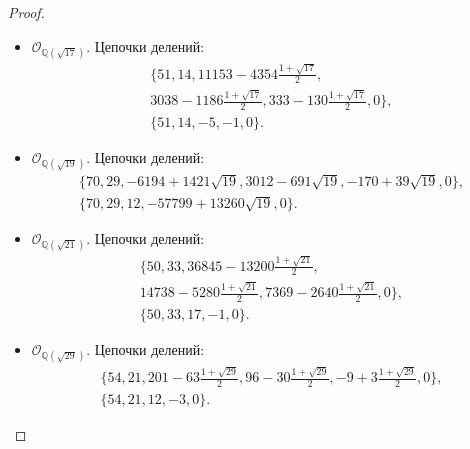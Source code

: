 \documentclass[_00_dissertation.tex]{subfiles}
\begin{document}
\begin{proof}
\begin{itemize}
        \item $\mathcal{O}_{\mathbb{Q}(\sqrt{17})}$.
        Цепочки делений:
        \begin{equation*}
            \begin{split}
                \{51, 14, 11153-4354\frac{1+\sqrt{17}}{2},\\
                    3038-1186\frac{1+\sqrt{17}}{2}, 333-130\frac{1+\sqrt{17}}{2}, 0\},\\
                \{51, 14, -5, -1, 0\}.
            \end{split}
        \end{equation*}
    
        \item $\mathcal{O}_{\mathbb{Q}(\sqrt{19})}$.
        Цепочки делений:
        \begin{equation*}
            \begin{split}
                \{70, 29, -6194+1421\sqrt{19}, 3012-691\sqrt{19}, -170+39\sqrt{19}, 0\},\\
                \{70, 29, 12, -57799+13260\sqrt{19}, 0\}.
            \end{split}
        \end{equation*}
    
        \item $\mathcal{O}_{\mathbb{Q}(\sqrt{21})}$.
        Цепочки делений:
        \begin{equation*}
            \begin{split}
                \{50, 33, 36845-13200\frac{1+\sqrt{21}}{2},\\
                    14738-5280\frac{1+\sqrt{21}}{2}, 7369-2640\frac{1+\sqrt{21}}{2}, 0\},\\
                \{50, 33, 17, -1, 0\}.
            \end{split}
        \end{equation*}
    
        \item $\mathcal{O}_{\mathbb{Q}(\sqrt{29})}$.
        Цепочки делений:
        \begin{equation*}
            \begin{split}
                \{54, 21, 201-63\frac{1+\sqrt{29}}{2}, 96-30\frac{1+\sqrt{29}}{2}, -9+3\frac{1+\sqrt{29}}{2}, 0\},\\
                \{54, 21, 12, -3, 0\}.
            \end{split}
        \end{equation*}
    

\end{itemize}
\end{proof}
\end{document}
